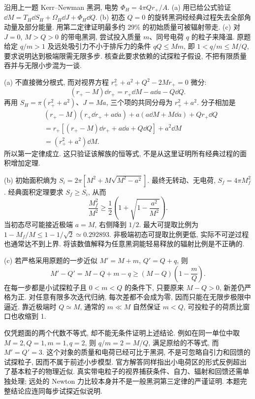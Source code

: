 \begin{exercise}
沿用上一题 Kerr--Newman 黑洞, 电势 $\Phi_H=4\pi Qr_+/A$.
(a) 用已给公式验证 $\dd M=T_H\dd S_H+\Omega_H\dd J+\Phi_H\dd Q$.
(b) 初态 $Q=0$ 的旋转黑洞经经典过程失去全部角动量及部分能量. 用第二定律证明最多约 $29\%$ 的初始质量可被辐射带走.
(c) 对 $J=0$, $M>Q>0$ 的带电黑洞, 尝试投入质量 $m$、同号电荷 $q$ 的粒子来降温. 原题给定 $q/m>1$ 及远处吸引力不小于排斥力的条件 $qQ\le Mm$, 即 $1<q/m\le M/Q$, 要求说明达到极端限需无限多步. 核查此要求依赖的试探粒子假设, 不把有限质量吞并与无限小步混为一谈.
\end{exercise}
\begin{solution}
(a) 不直接微分根式, 而对视界方程 $r_+^2+a^2+Q^2-2Mr_+=0$ 微分:
\[
(r_+-M)\dd r_+=r_+\dd M-a\dd a-Q\dd Q.
\]
再用 $S_H=\pi(r_+^2+a^2)$、$J=Ma$, 三个项的共同分母为 $r_+^2+a^2$. 分子相加是
\begin{align*}
&(r_+-M)(r_+\dd r_++a\dd a)
+a(a\dd M+M\dd a)+Qr_+\dd Q\\
&=r_+[(r_+-M)\dd r_++a\dd a+Q\dd Q]+a^2\dd M\\
&=(r_+^2+a^2)\dd M.
\end{align*}
所以第一定律成立. 这只验证该解族的恒等式, 不是从这里证明所有经典过程的面积增加定理.

(b) 初始面积熵为 $S_i=2\pi[M^2+M\sqrt{M^2-a^2}]$. 最终无转动、无电荷, $S_f=4\pi M_f^2$. 经典面积定理要求 $S_f\ge S_i$, 从而
\[
\frac{M_f^2}{M^2}\ge\frac12\left(1+\sqrt{1-\frac{a^2}{M^2}}\right).
\]
当初态尽可能接近极端 $a=M$, 右侧降到 $1/2$. 最大可提取比例为 $1-M_f/M\le1-1/\sqrt2\simeq0.292893$. 非极端初态可提取比例更低, 实际不可逆过程也通常达不到上界. 将该数值解释为任意黑洞能轻易释放的辐射比例是不正确的.

(c) 若严格采用原题的一步近似 $M'=M+m$, $Q'=Q+q$, 则
\[
M'-Q'=M-Q+m-q\ge (M-Q)\left(1-\frac mQ\right).
\]
在每一步都是小试探粒子且 $0<m<Q$ 的条件下, 只要原来 $M-Q>0$, 新差仍严格为正. 对任意有限多次迭代归纳, 每次差都不会成为零, 因而只能在无限步极限中逼近. 靠近极端时 $Q\simeq M$, 通常的 $m\ll M$ 自然保证 $m<Q$, 可投粒子的荷质比窗口也收缩到 1.

仅凭题面的两个代数不等式, 却不能无条件证明上述结论. 例如在同一单位中取 $M=2,Q=1,m=1,q=2$, 则 $q/m=2=M/Q$, 满足原给的不等式, 而 $M'=Q'=3$. 这个对象的质量和电荷已经可比于黑洞, 不是可忽略自引力和回馈的试探粒子, 因而不属于前述小步模型. 官方解答同样指出小电荷区的形式反例超出了基本粒子的物理近似. 真实带电粒子的视界捕获条件、自力、辐射和回馈还需单独处理; 远处的 Newton 力比较本身并不是一般黑洞第三定律的严谨证明. 本题完整结论应连同每步试探近似说明.
\end{solution}

